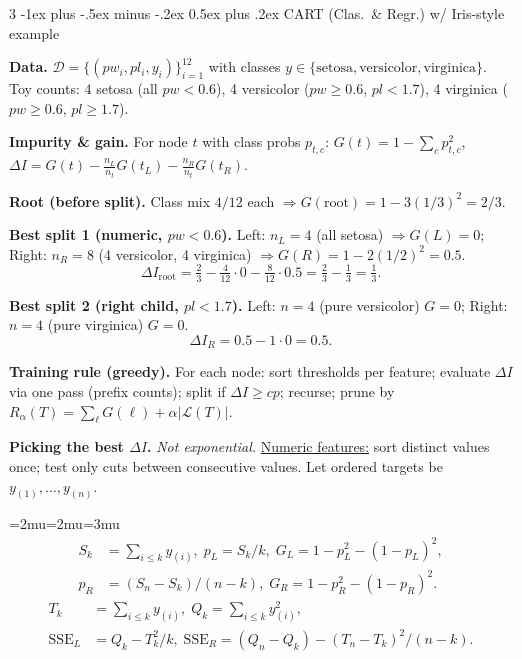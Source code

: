 \documentclass[10pt,landscape]{article}
\makeatletter
\renewcommand{\section}{\@startsection{section}{1}{0mm}%
                                {-1ex plus -.5ex minus -.2ex}%
                                {0.5ex plus .2ex}%
                                {\normalfont\large\bfseries}}
\newcommand{\tight}{\begingroup\scriptsize\thinmuskip=2mu\medmuskip=2mu\thickmuskip=3mu}
\newcommand{\untight}{\endgroup}
\makeatother
\begin{document}
\begin{multicols}{3}
    \section{CART (Clas.\ \& Regr.) w/ Iris-style example}

    \textbf{Data.} $\mathcal{D}=\{(pw_i,pl_i,y_i)\}_{i=1}^{12}$ with classes $y\in\{\text{setosa},\text{versicolor},\text{virginica}\}$.
    Toy counts: 4 setosa (all $pw<0.6$), 4 versicolor ($pw\ge0.6$, $pl<1.7$), 4 virginica ($pw\ge0.6$, $pl\ge1.7$).

    \textbf{Impurity \& gain.} For node $t$ with class probs $p_{t,c}$:
    $G(t)=1-\sum_c p_{t,c}^2$,\;
    $\Delta I=G(t)-\frac{n_L}{n_t}G(t_L)-\frac{n_R}{n_t}G(t_R)$.

    \textbf{Root (before split).} Class mix $4/12$ each $\Rightarrow G(\text{root})=1-3(1/3)^2=2/3$.

    \textbf{Best split 1 (numeric, $pw<0.6$).}
    Left: $n_L=4$ (all setosa) $\Rightarrow G(L)=0$;\;
    Right: $n_R=8$ (4 versicolor, 4 virginica) $\Rightarrow G(R)=1-2(1/2)^2=0.5$.
    \[
        \Delta I_{\text{root}}=\tfrac{2}{3}-\tfrac{4}{12}\cdot0-\tfrac{8}{12}\cdot0.5
        =\tfrac{2}{3}-\tfrac{1}{3}=\boxed{\tfrac{1}{3}}.
    \]

    \textbf{Best split 2 (right child, $pl<1.7$).}
    Left: $n=4$ (pure versicolor) $G=0$;\; Right: $n=4$ (pure virginica) $G=0$.
    \[
        \Delta I_{R}=0.5-1\cdot0=\boxed{0.5}.
    \]

    \textbf{Training rule (greedy).} For each node: sort thresholds per feature; evaluate $\Delta I$ via one pass (prefix counts); split if $\Delta I\!\ge\!cp$; recurse; prune by $R_\alpha(T)=\sum_{\ell}G(\ell)+\alpha|\mathcal L(T)|$.

    \textbf{Picking the best $\Delta I$.} \emph{Not exponential.}
    \underline{Numeric features:} sort distinct values once; test only cuts
    between consecutive values. Let ordered targets be $y_{(1)},\dots,y_{(n)}$.

    \tight
    \[
        \begin{aligned}
            S_k & =\sum_{i\le k}y_{(i)},\; p_L=S_k/k,\; G_L=1-p_L^2-(1-p_L)^2, \\
            p_R & =(S_n-S_k)/(n-k),\; G_R=1-p_R^2-(1-p_R)^2.
        \end{aligned}
    \]
    \[
        \begin{aligned}
            T_k            & =\sum_{i\le k}y_{(i)},\; Q_k=\sum_{i\le k}y_{(i)}^2, \\
            \mathrm{SSE}_L & =Q_k-T_k^2/k,\;
            \mathrm{SSE}_R=(Q_n-Q_k)-(T_n-T_k)^2/(n-k).
        \end{aligned}
    \]
    \untight




\end{multicols}
\end{document}
